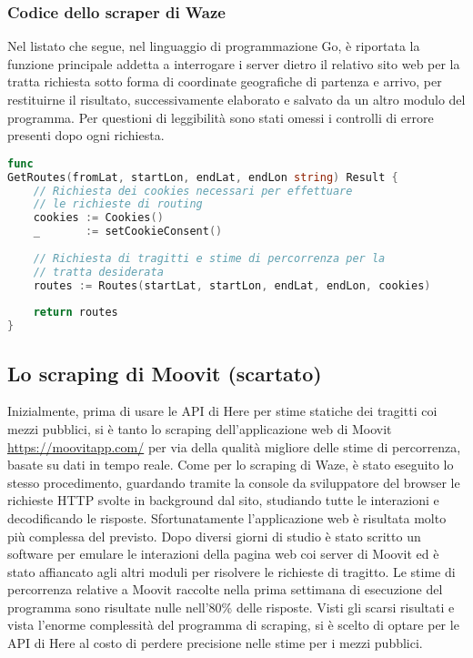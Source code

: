 \subsubsection{Codice dello scraper di Waze}

Nel listato che segue, nel linguaggio di programmazione Go, è riportata la funzione principale addetta a interrogare i server dietro il relativo sito web per la tratta richiesta sotto forma di coordinate geografiche di partenza e arrivo, per restituirne il risultato, successivamente elaborato e salvato da un altro modulo del programma. Per questioni di leggibilità sono stati omessi i controlli di errore presenti dopo ogni richiesta.

\begin{lstlisting}[language=Go]
func
GetRoutes(fromLat, startLon, endLat, endLon string) Result {
	// Richiesta dei cookies necessari per effettuare
	// le richieste di routing
	cookies := Cookies()
	_       := setCookieConsent()
	
	// Richiesta di tragitti e stime di percorrenza per la
	// tratta desiderata
	routes := Routes(startLat, startLon, endLat, endLon, cookies)
	
	return routes
}
\end{lstlisting}

\subsection{Lo scraping di Moovit (scartato)}

Inizialmente, prima di usare le API di Here per stime statiche dei tragitti coi mezzi pubblici, si è tanto lo scraping dell'applicazione web di Moovit \url{https://moovitapp.com/} per via della qualità migliore delle stime di percorrenza, basate su dati in tempo reale. Come per lo scraping di Waze, è stato eseguito lo stesso procedimento, guardando tramite la console da sviluppatore del browser le richieste HTTP svolte in background dal sito, studiando tutte le interazioni e decodificando le risposte. Sfortunatamente l'applicazione web è risultata molto più complessa del previsto. Dopo diversi giorni di studio è stato scritto un software per emulare le interazioni della pagina web coi server di Moovit ed è stato affiancato agli altri moduli per risolvere le richieste di tragitto. Le stime di percorrenza relative a Moovit raccolte nella prima settimana di esecuzione del programma sono risultate nulle nell'80\% delle risposte. Visti gli scarsi risultati e vista l'enorme complessità del programma di scraping, si è scelto di optare per le API di Here al costo di perdere precisione nelle stime per i mezzi pubblici.

